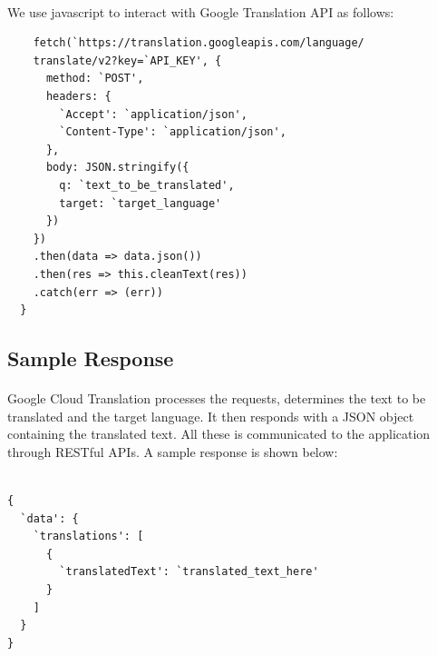 \documentclass[12pt]{article}
\begin{document}
\paragraph{}We use javascript to interact with Google Translation API as follows:

\begin{lstlisting}
    fetch(`https://translation.googleapis.com/language/
    translate/v2?key=`API_KEY', {
      method: `POST',
      headers: {
        `Accept': `application/json',
        `Content-Type': `application/json',
      },
      body: JSON.stringify({
        q: `text_to_be_translated',
        target: `target_language'
      })
    })
    .then(data => data.json())
    .then(res => this.cleanText(res))
    .catch(err => (err))
  }
\end{lstlisting}

\subsection{Sample Response}

\paragraph{} Google Cloud Translation processes the requests, determines the text to be translated  and the target language. It then responds with a JSON object containing the translated text. All these is communicated to the application through RESTful APIs. A sample response is shown below:

\begin{lstlisting}

{
  `data': {
    `translations': [
      {
        `translatedText': `translated_text_here'
      }
    ]
  }
}
\end{lstlisting}

\end{document}
